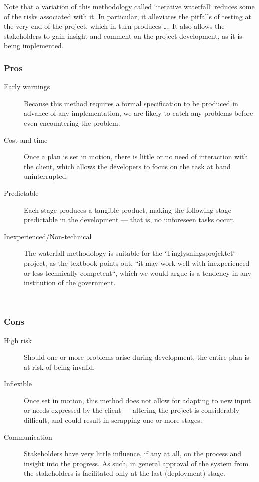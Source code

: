 \documentclass[11pt]{article}
\newcommand{\colbreak}{\vfill{\ }\columnbreak}
\begin{document}
Note that a variation of this methodology called `iterative waterfall` reduces some of the risks associated with it. In particular, it alleviates the pitfalls of testing at the very end of the project, which in turn produces \dots. It also allows the stakeholders to gain insight and comment on the project development, as it is being implemented.

\begin{multicols}{2}
    \subsubsection{Pros}
    \begin{description}
        \item[Early warnings] Because this method requires a formal specification to be produced in advance of any implementation, we are likely to catch any problems before even encountering the problem.
        \item[Cost and time] Once a plan is set in motion, there is little or no need of interaction with the client, which allows the developers to focus on the task at hand uninterrupted.
        \item[Predictable] Each stage produces a tangible product, making the following stage predictable in the development --- that is, no unforeseen tasks occur.
        \item[Inexperienced/Non-technical] The waterfall methodology is suitable for the `Tinglysningsprojektet`-project, as the textbook points out, ``it may work well with inexperienced or less technically competent``, which we would argue is a tendency in any institution of the government.
    \end{description}
    \colbreak
    
    \subsubsection{Cons}
    \begin{description}
        \item[High risk] Should one or more problems arise during development, the entire plan is at risk of being invalid.
        \item[Inflexible] Once set in motion, this method does not allow for adapting to new input or needs expressed by the client --- altering the project is considerably difficult, and could result in scrapping one or more stages.
        \item[Communication] Stakeholders have very little influence, if any at all, on the process and insight into the progress. As such, in general approval of the system from the stakeholders is facilitated only at the last (deployment) stage.
    \end{description}
\end{multicols}
\end{document}
